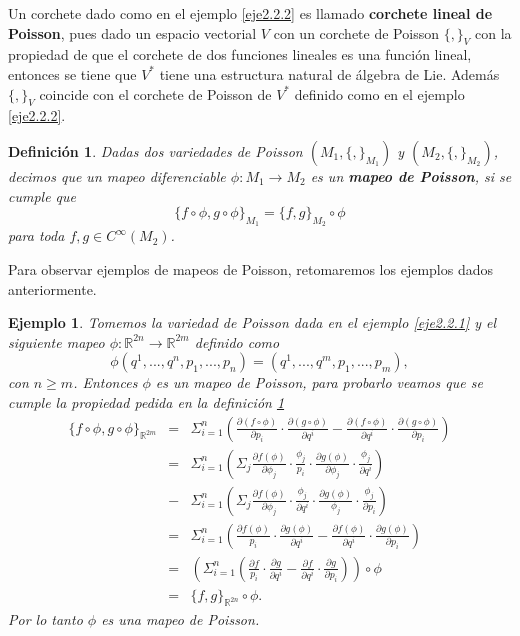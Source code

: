 \documentclass[a4paper,10pt]{book}
\newtheorem{definicion}{Definici\'on}[chapter]
\newtheorem{eje}{Ejemplo}[chapter]
\begin{document}
Un corchete dado como en el ejemplo \ref{eje2.2.2} es llamado {\bfseries corchete lineal de Poisson}, pues dado un espacio vectorial $V$ con un corchete de Poisson $\{,\}_{V}$ con la propiedad de que el corchete de dos funciones lineales es una funci\'on lineal, entonces se tiene que $V^{*}$ tiene una estructura natural de \'algebra de Lie. Adem\'as $\{,\}_{V}$ coincide con el corchete de Poisson de $V^{*}$ definido como en el ejemplo \ref{eje2.2.2}.

\begin{definicion}\label{DefMapPoi}
Dadas dos variedades de Poisson $(M_{1},\{,\}_{M_{1}})$ y $(M_{2},\{,\}_{M_{2}})$, decimos que un mapeo diferenciable $\phi:M_{1}\to M_{2}$ es un {\bfseries mapeo de Poisson}, si se cumple que 
$$\{f\circ\phi,g\circ\phi\}_{M_{1}}=\{f,g\}_{M_{2}}\circ\phi$$ 
para toda $f,g\in C^{\infty}(M_{2})$.
\end{definicion}

Para observar ejemplos de mapeos de Poisson, retomaremos los ejemplos dados anteriormente.

\begin{eje}\label{eje2.2.3}
Tomemos la variedad de Poisson dada en el ejemplo \ref{eje2.2.1} y el siguiente mapeo 
$\phi:\mathbb{R}^{2n}\to\mathbb{R}^{2m}$ definido como 
$$\phi(q^{1},...,q^{n},p_{1},...,p_{n})=(q^{1},...,q^{m},p_{1},...,p_{m}),$$ 
con $n\geq m$. Entonces $\phi$ es un mapeo de Poisson, para probarlo veamos que se cumple la propiedad pedida en la definici\'on \ref{DefMapPoi}
\begin{eqnarray*}
    \{f\circ\phi,g\circ\phi\}_{\mathbb{R}^{2m}} & = &\Sigma_{i=1}^{n} \left( \frac{\partial (f\circ\phi)}{\partial p_{i}} \cdot \frac{\partial (g\circ\phi)}{\partial q^{i}}-\frac{\partial (f\circ\phi)}{\partial q^{i}} \cdot \frac{\partial (g\circ\phi)}{\partial p_{i}} \right) \\
                              & = & \Sigma_{i=1}^{n} \left( \Sigma_{j} \frac{\partial f(\phi)}{\partial\phi_{j}} \cdot \frac{\phi_{j}}{p_{i}} \cdot \frac{\partial g(\phi)}{\partial \phi_{j}} \cdot \frac{\phi_{j}}{\partial q^{i}} \right) \\
                              & - & \Sigma_{i=1}^{n} \left( \Sigma_{j} \frac{\partial f(\phi)}{\partial\phi_{j}} \cdot \frac{\phi_{j}}{\partial q^{i}} \cdot \frac{\partial g(\phi)}{\phi_{j}} \cdot \frac{\phi_{j}}{\partial p_{i}} \right) \\
                              & = &\Sigma_{i=1}^{n}\left( \frac{\partial f(\phi)}{p_{i}} \cdot \frac{\partial g(\phi)}{\partial q^{i}}-\frac{\partial f(\phi)}{\partial q^{i}} \cdot \frac{\partial g(\phi)}{\partial p_{i}} \right) \\
                              & = &\left( \Sigma_{i=1}^{n} \left( \frac{\partial f}{p_{i}} \cdot \frac{\partial g}{\partial q^{i}}-\frac{\partial f}{\partial q^{i}} \cdot \frac{\partial g}{\partial p_{i}}\right)\right)\circ\phi\\
                              & = & \{ f,g \}_{\mathbb{R}^{2n}}\circ\phi.
\end{eqnarray*}
Por lo tanto $\phi$ es una mapeo de Poisson.
\end{eje}
\end{document}
